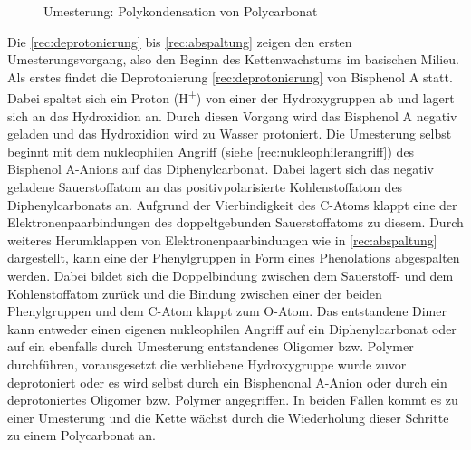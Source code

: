 \begin{figure}[H]
    \begin{center}
        \footnotesize
        \setatomsep{1.7em}


        \vspace{10pt}

        \chemrel{->}

        \caption{Umesterung: Polykondensation von Polycarbonat}
        \label{rec:polycarbonat}
    \end{center}
\end{figure}

Die \autoref{rec:deprotonierung} bis \autoref{rec:abspaltung} zeigen den ersten
Umesterungsvorgang, also den Beginn des Kettenwachstums im basischen Milieu. Als
erstes findet die Deprotonierung \autoref{rec:deprotonierung} von Bisphenol A
statt. Dabei spaltet sich ein Proton (H\textsuperscript{+}) von einer der
Hydroxygruppen ab und lagert sich an das Hydroxidion an. Durch diesen Vorgang
wird das Bisphenol A negativ geladen und das Hydroxidion wird zu Wasser
protoniert. Die Umesterung selbst beginnt mit dem nukleophilen Angriff (siehe
\autoref{rec:nukleophilerangriff}) des Bisphenol A-Anions auf das
Diphenylcarbonat. Dabei lagert sich das negativ geladene Sauerstoffatom an das
positivpolarisierte Kohlenstoffatom des Diphenylcarbonats an. Aufgrund der
Vierbindigkeit des C-Atoms \glqq klappt\grqq{} eine der Elektronenpaarbindungen
des doppeltgebunden Sauerstoffatoms zu diesem. Durch weiteres \glqq
Herumklappen\grqq{} von Elektronenpaarbindungen wie in \autoref{rec:abspaltung}
dargestellt, kann eine der Phenylgruppen in Form eines Phenolations abgespalten
werden. Dabei bildet sich die Doppelbindung zwischen dem Sauerstoff- und dem
Kohlenstoffatom zurück und die Bindung zwischen einer der beiden Phenylgruppen
und dem C-Atom \glqq klappt\grqq{} zum O-Atom. Das entstandene Dimer kann
entweder einen eigenen nukleophilen Angriff auf ein Diphenylcarbonat oder auf
ein ebenfalls durch Umesterung entstandenes Oligomer bzw. Polymer durchführen,
vorausgesetzt die verbliebene Hydroxygruppe wurde zuvor deprotoniert oder es
wird selbst durch ein Bisphenonal A-Anion oder durch ein deprotoniertes Oligomer
bzw. Polymer angegriffen. In beiden Fällen kommt es zu einer Umesterung und die
Kette wächst durch die Wiederholung dieser Schritte zu einem Polycarbonat an.

